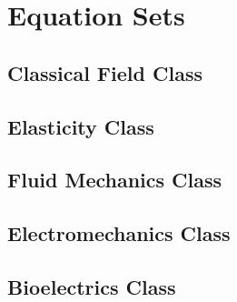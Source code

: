 \clearemptydoublepage
\chapter{Equation Sets}
\label{cha:equationsets}

\section{Classical Field Class}
\clearpage

\clearpage

\clearpage

\clearpage

\clearpage

\clearpage

\clearpage

\clearpage



\section{Elasticity Class}
\clearpage

\clearpage

\clearpage
\section{Fluid Mechanics Class}

\clearpage

\clearpage

\clearpage

\clearpage


\section{Electromechanics Class}

\clearpage

\clearpage




\section{Bioelectrics Class}
\clearpage

\clearpage
%
%

